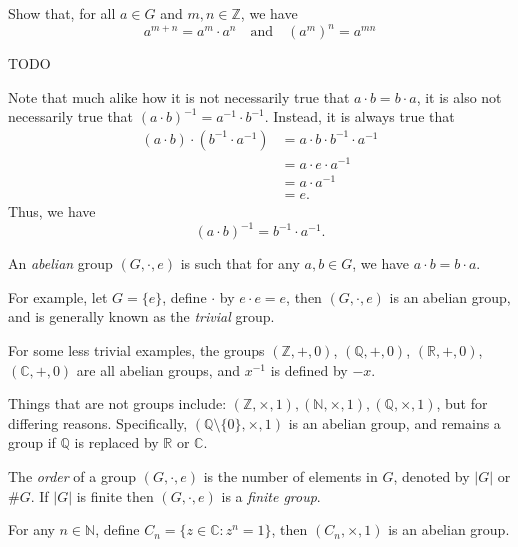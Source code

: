 \documentclass[12pt]{article}
\begin{document}
\begin{exercise}
    Show that, for all $a \in G$ and $m,n \in \mathbb{Z}$, we have
    \[
        a^{m+n} = a^{m}\cdot a^{n} 
        \quad \text{and} \quad
        (a^{m})^{n} = a^{mn}
    \]
\end{exercise}
\begin{nonproof}
    TODO
\end{nonproof}

Note that much alike how it is not necessarily true that
$a \cdot b = b \cdot a$, it is also not necessarily true that
$(a \cdot b)^{-1} = a^{-1} \cdot b^{-1}$. Instead, it is always true that
\begin{align*}
    (a \cdot b) \cdot (b^{-1} \cdot a^{-1})
    &= a \cdot b \cdot b^{-1} \cdot a^{-1}\\
    &= a \cdot e \cdot a^{-1}\\
    &= a \cdot a^{-1}\\
    &= e.
\end{align*}
Thus, we have
\[
    (a \cdot b)^{-1} = b^{-1} \cdot a^{-1}.
\]
\begin{definition}
    An \emph{abelian} group $(G,\cdot,e)$ is such that
    for any $a,b \in G$, we have
    $a \cdot b = b \cdot a$.
\end{definition}

For example, let $G = \{e\}$, define $\cdot$ by $e \cdot e = e$,
then $(G,\cdot,e)$ is an abelian group, and 
is generally known as the \emph{trivial} group.

For some less trivial examples,
the groups $(\mathbb{Z},+,0)$, $(\mathbb{Q},+,0)$, $(\mathbb{R},+,0)$, $(\mathbb{C},+,0)$
are all abelian groups, and $x^{-1}$ is defined by $-x$.

Things that are not groups include:
$(\mathbb{Z},\times,1),(\mathbb{N},\times,1),(\mathbb{Q},\times,1)$, 
but for differing reasons.
Specifically, $(\mathbb{Q} \setminus \{0\}, \times, 1)$ is an abelian group,
and remains a group if $\mathbb{Q}$ is replaced by $\mathbb{R}$ or $\mathbb{C}$.

\begin{definition}
    The \emph{order} of a group $(G,\cdot,e)$ is the 
    number of elements in $G$,
    denoted by $|G|$ or $\#G$.
    If $|G|$ is finite then $(G,\cdot,e)$ is a \emph{finite group}.
\end{definition}

For any $n \in \mathbb{N}$, define $C_n = \{z \in \mathbb{C} : z^{n} = 1\}$, then $(C_n,\times,1)$ is an abelian group.
\end{document}
